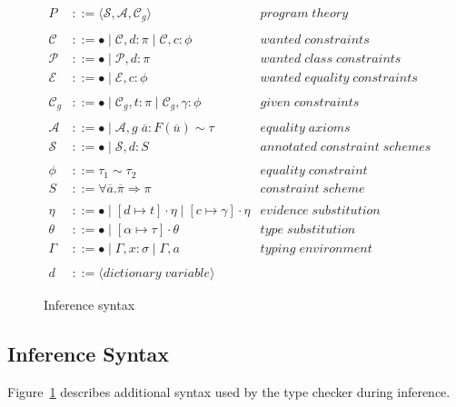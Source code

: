 \begin{figure}
\begin{align*}
    P &::= \langle \mathcal{S}, \mathcal{A}, \mathcal{C}_g \rangle &program \;
    theory
    \\
    \\
    \mathcal{C} &::= \bullet \mid \mathcal{C}, d : \pi \mid \mathcal{C}, c
    : \phi &wanted \; constraints
    \\
    \mathcal{P} &::= \bullet \mid \mathcal{P}, d : \pi &wanted \; class \;
    constraints
    \\
    \mathcal{E} &::= \bullet \mid \mathcal{E}, c : \phi &wanted \; equality
    \; constraints
    \\
    \\
    \mathcal{C}_g &::= \bullet \mid \mathcal{C}_g, t : \pi \mid \mathcal{C}_g,
    \gamma: \phi &given \; constraints
    \\
    \\
    \mathcal{A} &::= \bullet \mid \mathcal{A}, g \; \overline{a} :
    F(\overline{u}) \sim \tau &equality \; axioms
    \\
    \mathcal{S} &::= \bullet \mid \mathcal{S}, d : S &annotated \; constraint \;
    schemes
    \\ 
    \\
    \phi &::= \tau_1 \sim \tau_2 &equality \; constraint
    \\
    S &::= \forall \overline{a}. \overline{\pi} \Rightarrow \pi &constraint \;
    scheme
    \\
    \\
    \eta &::= \bullet \mid [d \mapsto t] \cdot \eta \mid [c \mapsto \gamma]
    \cdot \eta &evidence \; substitution
    \\
    \theta &::= \bullet \mid [\alpha \mapsto \tau] \cdot \theta &type \;
    substitution
    \\
    \Gamma &::= \bullet \mid \Gamma, x : \sigma \mid \Gamma, a &typing \; environment
    \\
    \\
    d &::= \langle dictionary \; variable \rangle
\end{align*}
\caption{Inference syntax}
\label{fig:inference-syntax}
\end{figure}
\subsection{Inference Syntax}
Figure~\ref{fig:inference-syntax} describes additional syntax used by the type
checker during inference.


